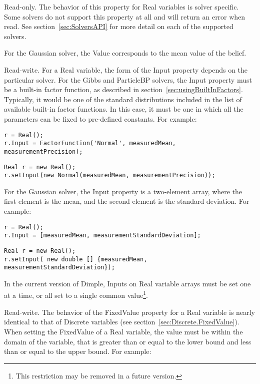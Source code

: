 
Read-only.  The behavior of this property for Real variables is solver specific.  Some solvers do not support this property at all and will return an error when read.  See section~\ref{sec:SolversAPI} for more detail on each of the supported solvers.

For the Gaussian solver, the Value corresponds to the mean value of the belief.



Read-write.  For a Real variable, the form of the Input property depends on the particular solver.  For the Gibbs and ParticleBP solvers, the Input property must be a built-in factor function, as described in section~\ref{sec:usingBuiltInFactors}.  Typically, it would be one of the standard distributions included in the list of available built-in factor functions.  In this case, it must be one in which all the parameters can be fixed to pre-defined constants.  For example:

\ifmatlab
\begin{lstlisting}
r = Real();
r.Input = FactorFunction('Normal', measuredMean, measurementPrecision);
\end{lstlisting}
\fi

\ifjava
\begin{lstlisting}
Real r = new Real();
r.setInput(new Normal(measuredMean, measurementPrecision));
\end{lstlisting}
\fi

For the Gaussian solver, the Input property is a two-element array, where the first element is the mean, and the second element is the standard deviation.  For example:

\ifmatlab
\begin{lstlisting}
r = Real();
r.Input = [measuredMean, measurementStandardDeviation];
\end{lstlisting}
\fi

\ifjava
\begin{lstlisting}
Real r = new Real();
r.setInput( new double [] {measuredMean, measurementStandardDeviation});
\end{lstlisting}
\fi

In the current version of Dimple, Inputs on Real variable arrays must be set one at a time, or all set to a single common value\footnote{This restriction may be removed in a future version.}.


Read-write.  The behavior of the FixedValue property for a Real variable is nearly identical to that of Discrete variables (see section~\ref{sec:Discrete.FixedValue}).  When setting the FixedValue of a Real variable, the value must be within the domain of the variable, that is greater than or equal to the lower bound and less than or equal to the upper bound.  For example:

